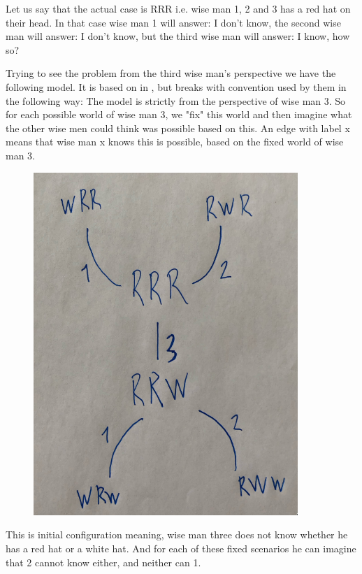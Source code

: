 Let us say that the actual case is RRR i.e. wise man 1, 2 and 3 has a red hat on their head.
In that case wise man 1 will answer: I don't know, the second wise man will answer: I don't know, but the third wise man will answer: I know, how so?

Trying to see the problem from the third wise man's perspective we have the following model. It is based on \KTfourfiveN in \cite{HuthAndRyan2004}, but breaks with convention used by them in the following way:
The model is strictly from the perspective of wise man 3. So for each possible world of wise man 3, we "fix" this world and then imagine what the other wise men could think was possible based on this. An edge with label x means that wise man x knows this is possible, based on the fixed world of wise man 3.
\begin{figure}[H]
	\center
\includegraphics[width=10cm]{images/three_wise_men_round_0.png}
\end{figure}
This is initial configuration meaning, wise man three does not know whether he has a red hat or a white hat. And for each of these fixed scenarios he can imagine that 2 cannot know either, and neither can 1.

